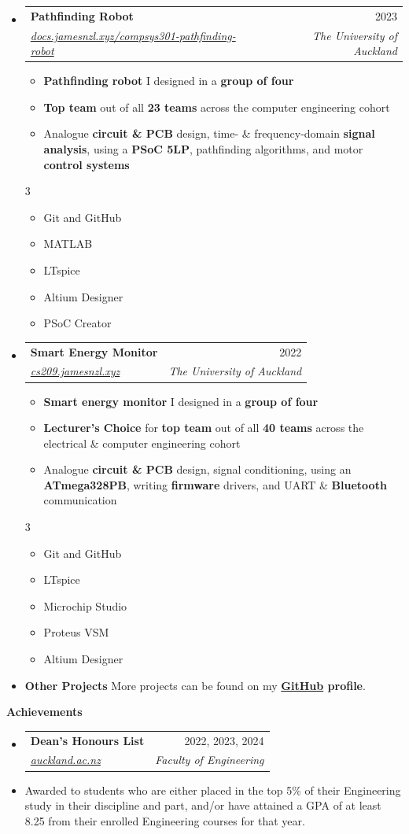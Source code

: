 \documentclass[11pt,a4paper]{article}[leftmargin=*]
\makeatletter
\def \entryspacing {-0pt}
\def \bulletstylei {\faAngleRight\hspace{-4.5pt}}
\def \bulletstyleii {\faCaretRight\hspace{-4.5pt}}
\renewcommand{\section}[2]{\vspace{5pt}
  \colorbox{secondary}{\color{white}\raggedbottom\normalsize\textbf{{#1}{\hspace{2pt}#2\hspace{4pt}}}}
}
\newcommand{\resumeEntryStart}{\begin{itemize}[leftmargin=2.5mm]}
\newcommand{\resumeEntryEnd}{\end{itemize}\vspace{\entryspacing}}
\newcommand{\resumeItemListStart}{\begin{itemize}[leftmargin=4.5mm]}
\newcommand{\resumeItemListEnd}{\end{itemize}}
\newcommand{\resumeItemListStartColumns}[2][-0.5]{\vspace*{#1\multicolsep}
\begin{multicols}{#2}\begin{itemize}[leftmargin=4.5mm]}
\newcommand{\resumeItemListEndColumns}[1][-1]{\end{itemize}\end{multicols}\vspace*{#1\multicolsep}}
\newcommand{\resumeItem}[2][\bulletstylei]{
  \item[\small#1]\small{
    {#2 \vspace{-2pt}}
  }
}
\newcommand{\resumeEntryTSDL}[4]{
  \vspace{-1pt}\item[]
    \begin{tabularx}{0.97\textwidth}{X@{\hspace{60pt}}r}
      \textbf{\color{primary}#1} & {\firabook\color{accent}\small#2} \\
      \textit{\color{accent}\small#3} & \textit{\color{accent}\small#4} \\
    \end{tabularx}\vspace{-6pt}
}
\newcommand{\resumeEntryS}[2]{
  \item[]\small{
    \textbf{\color{primary}#1 }{ #2 \vspace{-4pt}}
  }
}
\newcommand{\resumeEntryP}[1]{
  \item[]\small{
    #1 \vspace{-4pt}
  }\\
}
\newcommand{\resumeBf}[1]{\small\textbf{\color{halfbold}#1}}
\makeatother
\begin{document}
\resumeEntryStart
\resumeEntryTSDL
{Pathfinding Robot}{2023}
{\href{https://docs.jamesnzl.xyz/compsys301-pathfinding-robot}{docs.jamesnzl.xyz/compsys301-pathfinding-robot}}{The University of Auckland}
\resumeItemListStart
\resumeItem {\resumeBf{Pathfinding robot} I designed in a \resumeBf{group of four}}
\resumeItem {\resumeBf{Top team} out of all \resumeBf{23 teams} across the computer engineering cohort}
\resumeItem {Analogue \resumeBf{circuit \& PCB} design, time- \& frequency-domain \resumeBf{signal analysis}, using a \resumeBf{PSoC 5LP}, pathfinding algorithms, and motor \resumeBf{control systems}}
\resumeItemListEnd
\resumeItemListStartColumns{3}
\resumeItem[\bulletstyleii] {Git and GitHub}
\resumeItem[\bulletstyleii] {MATLAB}
\resumeItem[\bulletstyleii] {LTspice}
\resumeItem[\bulletstyleii] {Altium Designer}
\resumeItem[\bulletstyleii] {PSoC Creator}
\resumeItemListEndColumns
\resumeEntryEnd

\resumeEntryStart
\resumeEntryTSDL
{Smart Energy Monitor}{2022}
{\href{https://cs209.jamesnzl.xyz}{cs209.jamesnzl.xyz}}{The University of Auckland}
\resumeItemListStart
\resumeItem {\resumeBf{Smart energy monitor} I designed in a \resumeBf{group of four}}
\resumeItem {\resumeBf{Lecturer's Choice} for \resumeBf{top team} out of all \resumeBf{40 teams} across the electrical \& computer engineering cohort}
\resumeItem {Analogue \resumeBf{circuit \& PCB} design, signal conditioning, using an \resumeBf{ATmega328PB}, writing \resumeBf{firmware} drivers, and UART \& \resumeBf{Bluetooth} communication}
\resumeItemListEnd
\resumeItemListStartColumns{3}
\resumeItem[\bulletstyleii] {Git and GitHub}
\resumeItem[\bulletstyleii] {LTspice}
\resumeItem[\bulletstyleii] {Microchip Studio}
\resumeItem[\bulletstyleii] {Proteus VSM}
\resumeItem[\bulletstyleii] {Altium Designer}
\resumeItemListEndColumns
\resumeEntryEnd

\resumeEntryStart
\resumeEntryS
{Other Projects}{More projects can be found on my \resumeBf{\href{https://github.com/jamesnzl}{GitHub} profile}.}
\resumeEntryEnd


\section{\faTrophy}{Achievements}

\resumeEntryStart
\resumeEntryTSDL
{Dean's Honours List}{2022, 2023, 2024}
{\href{https://www.auckland.ac.nz/en/engineering/current-students/undergraduate/deans-honours-list.html}{auckland.ac.nz}}{Faculty of Engineering}
\resumeEntryP {Awarded to students who are either placed in the top 5\% of their Engineering study in their discipline and part, and/or have attained a GPA of at least 8.25 from their enrolled Engineering courses for that year.}
\resumeEntryEnd
\end{document}
